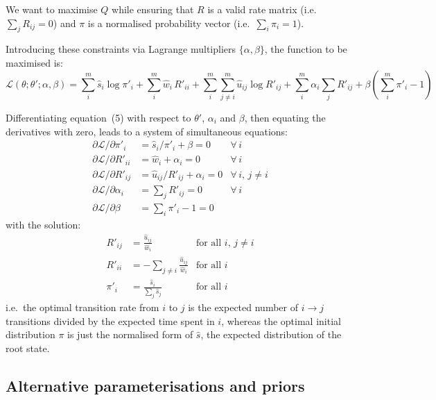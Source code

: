 \documentclass[12pt]{article}
\begin{document}
We want to maximise $Q$ while ensuring that $R$ is a valid rate matrix (i.e.\ $\sum_j R_{ij} = 0$)
and $\pi$ is a normalised probability vector (i.e.\ $\sum_i \pi_i = 1$).

Introducing these constraints via Lagrange multipliers $\{\alpha, \beta\}$, the function to be
maximised is:
\begin{equation}
\mathcal{L}(\theta; \theta'; \alpha, \beta) = \sum_{i}^{m} \hat{s}_i \log \pi'_i + \sum_{i}^{m} \hat{w}_i\, R'_{ii} + \sum_{i}^{m} \sum_{j \neq i}^{m} \hat{u}_{ij} \log R'_{ij} + \sum_{i}^{m} \alpha_i \sum_{j} R'_{ij} + \beta \left(\sum_{i}^{m} \pi'_i - 1\right)
\end{equation}

Differentiating equation~(5) with respect to $\theta'$, $\alpha_i$ and $\beta$, then equating the
derivatives with zero, leads to a system of simultaneous equations:
\begin{align*}
\partial\mathcal{L}/\partial\pi'_i &= \hat{s}_i / \pi'_i + \beta = 0 & \forall\, i \\
\partial\mathcal{L}/\partial R'_{ii} &= \hat{w}_i + \alpha_i = 0 & \forall\, i \\
\partial\mathcal{L}/\partial R'_{ij} &= \hat{u}_{ij} / R'_{ij} + \alpha_i = 0 & \forall\, i,\, j \neq i \\
\partial\mathcal{L}/\partial\alpha_i &= \sum_j R'_{ij} = 0 & \forall\, i \\
\partial\mathcal{L}/\partial\beta &= \sum_i \pi'_i - 1 = 0 &
\end{align*}
with the solution:
\begin{equation}
\begin{aligned}
R'_{ij} &= \frac{\hat{u}_{ij}}{\hat{w}_i} & \text{for all } i,\, j \neq i \\[6pt]
R'_{ii} &= -\sum_{j \neq i} \frac{\hat{u}_{ij}}{\hat{w}_i} & \text{for all } i \\[6pt]
\pi'_i &= \frac{\hat{s}_i}{\sum_j \hat{s}_j} & \text{for all } i
\end{aligned}
\end{equation}
i.e.\ the optimal transition rate from $i$ to $j$ is the expected number of $i \to j$ transitions
divided by the expected time spent in $i$, whereas the optimal initial distribution $\pi$ is just the
normalised form of $\hat{s}$, the expected distribution of the root state.


\subsection{Alternative parameterisations and priors}
\end{document}
